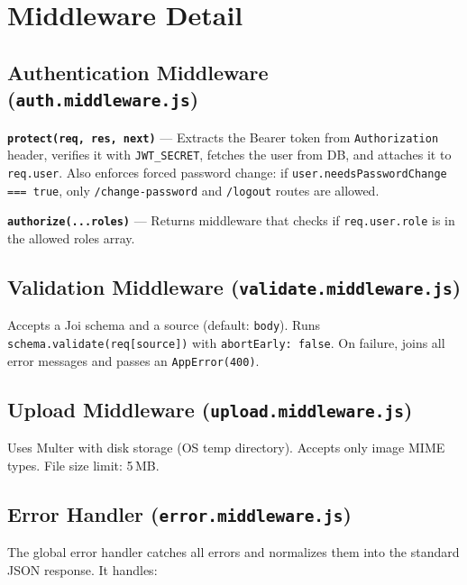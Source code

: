 \section{Middleware Detail}

\subsection{Authentication Middleware (\texttt{auth.middleware.js})}

\textbf{\texttt{protect(req, res, next)}} --- Extracts the Bearer token from \texttt{Authorization} header, verifies it with \texttt{JWT\_SECRET}, fetches the user from DB, and attaches it to \texttt{req.user}. Also enforces forced password change: if \texttt{user.needsPasswordChange === true}, only \texttt{/change-password} and \texttt{/logout} routes are allowed.

\textbf{\texttt{authorize(...roles)}} --- Returns middleware that checks if \texttt{req.user.role} is in the allowed roles array.

\subsection{Validation Middleware (\texttt{validate.middleware.js})}

Accepts a Joi schema and a source (default: \texttt{body}). Runs \texttt{schema.validate(req[source])} with \texttt{abortEarly: false}. On failure, joins all error messages and passes an \texttt{AppError(400)}.

\subsection{Upload Middleware (\texttt{upload.middleware.js})}

Uses Multer with disk storage (OS temp directory). Accepts only image MIME types. File size limit: 5\,MB.

\subsection{Error Handler (\texttt{error.middleware.js})}

The global error handler catches all errors and normalizes them into the standard JSON response. It handles:


